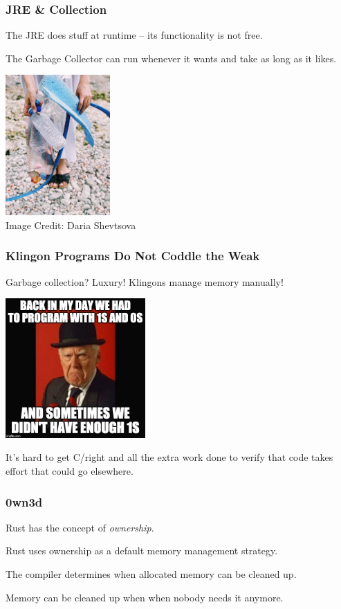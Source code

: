 \begin{frame}
\frametitle{JRE \& Collection}

The JRE does stuff at runtime -- its functionality is not free. 

The Garbage Collector can run whenever it wants and take as long as it likes.

\begin{center}
	\includegraphics[width=0.3\textwidth]{images/garbage.jpg}\\
	Image Credit: Daria Shevtsova
\end{center}

\end{frame}


\begin{frame}
\frametitle{Klingon Programs Do Not Coddle the Weak}

Garbage collection? Luxury! Klingons manage memory manually!

\begin{center}
	\includegraphics[width=0.4\textwidth]{images/grumpyman.jpg}
\end{center}

It's hard to get C/\CPP right and all the extra work done to verify that code takes effort that could go elsewhere.



\end{frame}


\begin{frame}
\frametitle{0wn3d}

Rust has the concept of \textit{ownership}. 

Rust uses ownership as a default memory management strategy.

The compiler determines when allocated memory can be cleaned up.

Memory  can be cleaned up when when nobody needs it anymore.

\end{frame}


